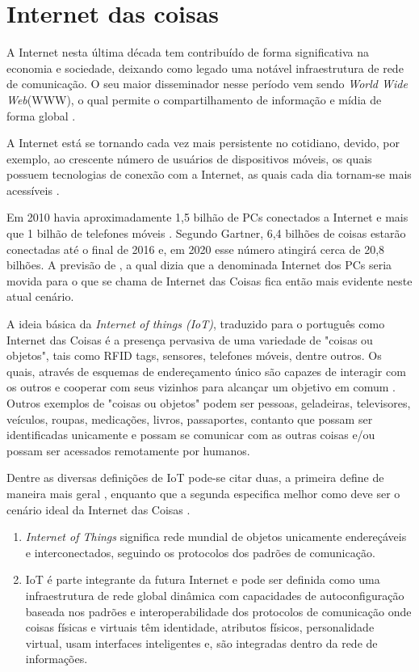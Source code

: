 ﻿\section{Internet das coisas}
\label{sec:iot}
A Internet nesta última década tem contribuído de forma significativa na economia e sociedade, deixando como legado uma notável infraestrutura de rede de comunicação. O seu maior disseminador nesse período vem sendo \textit{World Wide Web}(WWW), o qual permite o compartilhamento de informação e mídia de forma global \cite{Chandrakanth:2014}.

A Internet está se tornando cada vez mais persistente no cotidiano, devido, por exemplo, ao crescente número de usuários de dispositivos móveis, os quais possuem tecnologias de conexão com a Internet, as quais cada dia tornam-se mais acessíveis \cite{Chandrakanth:2014}.

Em 2010 havia aproximadamente 1,5 bilhão de PCs conectados a Internet e mais que 1 bilhão de telefones móveis \cite{Sundmaeker:2010}. Segundo Gartner\footnotemark {}, 6,4 bilhões de coisas estarão conectadas até o final de 2016 e, em 2020 esse número atingirá cerca de 20,8 bilhões. A previsão de \cite{Sundmaeker:2010}, a qual dizia que a denominada Internet dos PCs seria movida para o que se chama de Internet das Coisas fica então mais evidente neste atual cenário.

A ideia básica da \textit{Internet of things (IoT)}, traduzido para o português como Internet das Coisas é a presença pervasiva de uma variedade de "coisas ou objetos", tais como RFID tags, sensores, telefones móveis, dentre outros. Os quais, através de esquemas de endereçamento único são capazes de interagir com os outros e cooperar com seus vizinhos para alcançar um objetivo em comum \cite{Atzori:2010}. Outros exemplos de "coisas ou objetos" podem ser pessoas, geladeiras, televisores, veículos, roupas, medicações, livros, passaportes, contanto que possam ser identificadas unicamente e possam se comunicar com as outras coisas e/ou possam ser acessados remotamente por humanos.

Dentre as diversas definições de IoT pode-se citar duas, a primeira define de maneira mais geral \cite{iot2020:2008}, enquanto que a segunda especifica melhor como deve ser o cenário ideal da Internet das Coisas \cite{Sundmaeker:2010}.
\begin{enumerate}
\item \textit{Internet of Things} significa rede mundial de objetos unicamente endereçáveis e interconectados, seguindo os protocolos dos padrões de comunicação.
\item IoT é parte integrante da futura Internet e pode ser definida como uma infraestrutura de rede global dinâmica com capacidades de autoconfiguração baseada nos padrões e interoperabilidade dos protocolos de comunicação onde coisas físicas e virtuais têm identidade, atributos físicos, personalidade virtual, usam interfaces inteligentes e, são integradas dentro da rede de informações.
\end{enumerate}

